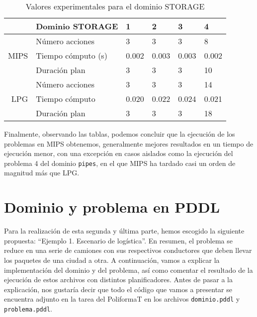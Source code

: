 \documentclass[a4paper]{article}
\begin{document}
\begin{table}[H] \label{fstorage}
\begin{center}
\begin{tabular}{r|c| l|l|l|l|}
& Dominio STORAGE & 1 & 2 & 3 & 4 \\ \hline \hline
\multirow{3}{*}{MIPS} & \multicolumn{1}{l|}{Número acciones} & \multicolumn{1}{l|}{3} & \multicolumn{1}{l|}{3} & \multicolumn{1}{l|}{3} & \multicolumn{1}{l|}{8} \\\cline{2-6}
                     & \multicolumn{1}{l|}{Tiempo cómputo (s)} & \multicolumn{1}{l|}{0.002} & \multicolumn{1}{l|}{0.003} & \multicolumn{1}{l|}{0.003} & \multicolumn{1}{l|}{0.002} \\\cline{2-6}
                     & \multicolumn{1}{l|}{Duración plan} & \multicolumn{1}{l|}{3} & \multicolumn{1}{l|}{3} & \multicolumn{1}{l|}{3} & \multicolumn{1}{l|}{10} \\\hline \hline
\multirow{3}{*}{LPG} & \multicolumn{1}{l|}{Número acciones} & \multicolumn{1}{l|}{3} & \multicolumn{1}{l|}{3} & \multicolumn{1}{l|}{3} & \multicolumn{1}{l|}{14} \\\cline{2-6}
                     & \multicolumn{1}{l|}{Tiempo cómputo} & \multicolumn{1}{l|}{0.020} & \multicolumn{1}{l|}{0.022} & \multicolumn{1}{l|}{0.024} & \multicolumn{1}{l|}{0.021} \\\cline{2-6}
                     & \multicolumn{1}{l|}{Duración plan} & \multicolumn{1}{l|}{3} & \multicolumn{1}{l|}{3} & \multicolumn{1}{l|}{3} & \multicolumn{1}{l|}{18} \\\hline
\end{tabular}
\caption{Valores experimentales para el dominio STORAGE}
\end{center}
\end{table}
Finalmente, observando las tablas, podemos concluir que la ejecución de los problemas en MIPS obtenemos, generalmente mejores resultados en un tiempo de ejecución menor, con una excepción en casos aislados como la ejecución del problema 4 del dominio \texttt{pipes}, en el que MIPS ha tardado casi un orden de magnitud más que LPG.
\section{Dominio y problema en PDDL}
Para la realización de esta segunda y última parte, hemos escogido la siguiente propuesta: “Ejemplo 1. Escenario de logística”. En resumen, el problema se reduce en una serie de camiones con sus respectivos conductores que deben llevar los paquetes de una ciudad a otra. A continuación, vamos a explicar la implementación del dominio y del problema, así como comentar el resultado de la ejecución de estos archivos con distintos planificadores.
Antes de pasar a la explicación, nos gustaría decir que todo el código que vamos a presentar se encuentra adjunto en la tarea del PoliformaT en los archivos \texttt{dominio.pddl} y \texttt{problema.pddl}.
\end{document}

